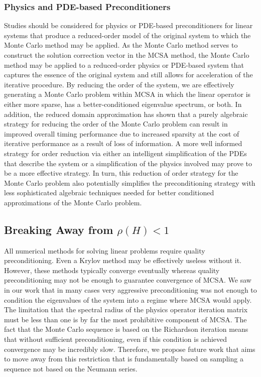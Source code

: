 \subsubsection{Physics and PDE-based Preconditioners}
Studies should be considered for physics or PDE-based preconditioners
for linear systems that produce a reduced-order model of the original
system to which the Monte Carlo method may be applied. As the Monte
Carlo method serves to construct the solution correction vector in the
MCSA method, the Monte Carlo method may be applied to a reduced-order
physics or PDE-based system that captures the essence of the original
system and still allows for acceleration of the iterative
procedure. By reducing the order of the system, we are effectively
generating a Monte Carlo problem within MCSA in which the linear
operator is either more sparse, has a better-conditioned eigenvalue
spectrum, or both. In addition, the reduced domain approximation has
shown that a purely algebraic strategy for reducing the order of the
Monte Carlo problem can result in improved overall timing performance
due to increased sparsity at the cost of iterative performance as a
result of loss of information. A more well informed strategy for order
reduction via either an intelligent simplification of the PDEs that
describe the system or a simplification of the physics involved may
prove to be a more effective strategy. In turn, this reduction of
order strategy for the Monte Carlo problem also potentially simplifies
the preconditioning strategy with less sophisticated algebraic
techniques needed for better conditioned approximations of the Monte
Carlo problem.

\subsection{Breaking Away from $\rho(H) < 1$}
\label{subsec:future_spec_rad}
All numerical methods for solving linear problems require quality
preconditioning. Even a Krylov method may be effectively useless
without it. However, these methods typically converge eventually
whereas quality preconditioning may not be enough to guarantee
convergence of MCSA. We saw in our work that in many cases very
aggressive preconditioning was not enough to condition the eigenvalues
of the system into a regime where MCSA would apply. The limitation
that the spectral radius of the physics operator iteration matrix must
be less than one is by far the most prohibitive component of MCSA. The
fact that the Monte Carlo sequence is based on the Richardson
iteration means that without sufficient preconditioning, even if this
condition is achieved convergence may be incredibly slow. Therefore,
we propose future work that aims to move away from this restriction
that is fundamentally based on sampling a sequence not based on the
Neumann series.

